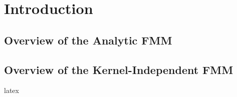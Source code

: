 \chapter{Introduction}\label{chapter:introduction}
\section{Overview of the Analytic FMM}

\section{Overview of the Kernel-Independent FMM}


\Gls{latex}
